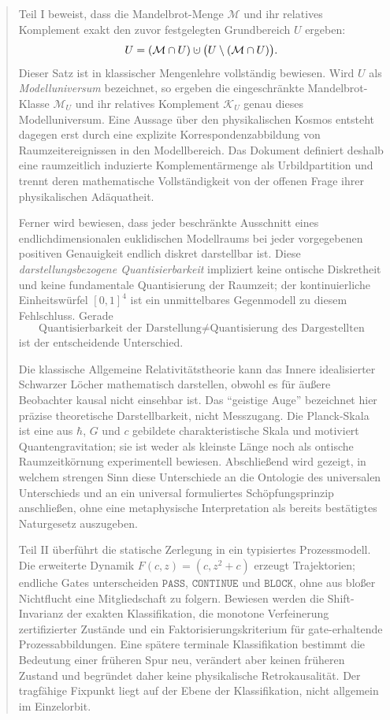 \documentclass[11pt,a4paper]{article}
\theoremstyle{remark}
\newcommand{\M}{\mathcal{M}}
\newcommand{\K}{\mathcal{K}}
\newcommand{\PASS}{\texttt{PASS}}
\newcommand{\CONTINUE}{\texttt{CONTINUE}}
\newcommand{\BLOCK}{\texttt{BLOCK}}
\newcommand{\dotcup}{\mathbin{\mathaccent\cdot\cup}}
\begin{document}
\begin{abstract}
Teil I beweist, dass die Mandelbrot-Menge \(\M\) und ihr relatives Komplement
exakt den zuvor festgelegten Grundbereich \(U\) ergeben:
\[
  U=(\M\cap U)\dotcup\bigl(U\setminus(\M\cap U)\bigr).
\]
Dieser Satz ist in klassischer Mengenlehre vollständig bewiesen. Wird \(U\)
als \emph{Modelluniversum} bezeichnet, so ergeben die eingeschränkte
Mandelbrot-Klasse \(\M_U\) und ihr relatives Komplement \(\K_U\) genau dieses
Modelluniversum. Eine Aussage über den physikalischen
Kosmos entsteht dagegen erst durch eine explizite Korrespondenzabbildung von
Raumzeitereignissen in den Modellbereich. Das Dokument definiert deshalb eine
raumzeitlich induzierte Komplementärmenge als Urbildpartition und trennt deren
mathematische Vollständigkeit von der offenen Frage ihrer physikalischen
Adäquatheit.

Ferner wird bewiesen, dass jeder beschränkte Ausschnitt eines
endlichdimensionalen euklidischen Modellraums bei jeder vorgegebenen positiven
Genauigkeit endlich diskret darstellbar ist. Diese
\emph{darstellungsbezogene Quantisierbarkeit} impliziert keine ontische
Diskretheit und keine fundamentale Quantisierung der Raumzeit; der
kontinuierliche Einheitswürfel \([0,1]^4\) ist ein unmittelbares Gegenmodell zu diesem
Fehlschluss. Gerade
\[
  \text{Quantisierbarkeit der Darstellung}
  \neq
  \text{Quantisierung des Dargestellten}
\]
ist der entscheidende Unterschied.

Die klassische Allgemeine Relativitätstheorie kann das Innere idealisierter
Schwarzer Löcher mathematisch darstellen, obwohl es für äußere Beobachter
kausal nicht einsehbar ist. Das ``geistige Auge'' bezeichnet hier präzise
theoretische Darstellbarkeit, nicht Messzugang. Die Planck-Skala ist eine aus
\(\hbar\), \(G\) und \(c\) gebildete charakteristische Skala und motiviert
Quantengravitation; sie ist weder als kleinste Länge noch als ontische
Raumzeitkörnung experimentell bewiesen. Abschließend wird gezeigt, in welchem
strengen Sinn diese Unterschiede an die Ontologie des universalen
Unterschieds und an ein universal formuliertes Schöpfungsprinzip anschließen,
ohne eine metaphysische Interpretation als bereits bestätigtes Naturgesetz
auszugeben.

Teil II überführt die statische Zerlegung in ein typisiertes Prozessmodell.
Die erweiterte Dynamik \(F(c,z)=(c,z^2+c)\) erzeugt Trajektorien; endliche
Gates unterscheiden \(\PASS\), \(\CONTINUE\) und \(\BLOCK\), ohne
aus bloßer Nichtflucht eine Mitgliedschaft zu folgern. Bewiesen werden die
Shift-Invarianz der exakten Klassifikation, die monotone Verfeinerung
zertifizierter Zustände und ein Faktorisierungskriterium für gate-erhaltende
Prozessabbildungen. Eine spätere terminale Klassifikation bestimmt die
Bedeutung einer früheren Spur neu, verändert aber keinen früheren Zustand und
begründet daher keine physikalische Retrokausalität. Der tragfähige Fixpunkt
liegt auf der Ebene der Klassifikation, nicht allgemein im Einzelorbit.


\end{abstract}
\end{document}
